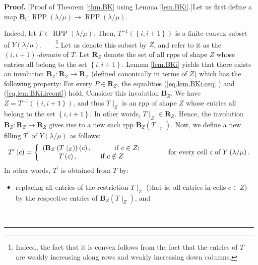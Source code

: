 \documentclass[numbers=enddot,12pt,final,onecolumn,notitlepage]{scrartcl}%
\theoremstyle{definition}
\newenvironment{proof}[1][Proof]{\noindent\textbf{#1.} }{\ \rule{0.5em}{0.5em}}
\newenvironment{verlong}{}{}
\begin{document}
\begin{verlong}
\begin{proof}
[Proof of Theorem \ref{thm.BK} using Lemma \ref{lem.BKi}.]Let us first define
a map $\mathbf{B}_{i}:\operatorname*{RPP}\left(  \lambda/\mu\right)
\rightarrow\operatorname*{RPP}\left(  \lambda/\mu\right)  $.

Indeed, let $T\in\operatorname*{RPP}\left(  \lambda/\mu\right)  $. Then,
$T^{-1}\left(  \left\{  i,i+1\right\}  \right)  $ is a finite convex subset of
$Y\left(  \lambda/\mu\right)  $.\ \ \ \ \footnote{Indeed, the fact that it is
convex follows from the fact that the entries of $T$ are weakly increasing
along rows and weakly increasing down columns.} Let us denote this subset by
$Z$, and refer to it as the $\left(  i,i+1\right)  $\textit{-domain} of $T$.
Let $\mathbf{R}_{Z}$ denote the set of all rpps of shape $Z$ whose entries all
belong to the set $\left\{  i,i+1\right\}  $. Lemma \ref{lem.BKi} yields that
there exists an involution $\mathbf{B}_{Z}:\mathbf{R}_{Z}\rightarrow
\mathbf{R}_{Z}$ (defined canonically in terms of $Z$) which has the following
property: For every $P\in\mathbf{R}_{Z}$, the equalities (\ref{eq.lem.BKi.ceq}%
) and (\ref{eq.lem.BKi.ircont}) hold. Consider this involution $\mathbf{B}%
_{Z}$. We have $Z=T^{-1}\left(  \left\{  i,i+1\right\}  \right)  $, and thus
$T\mid_{Z}$ is an rpp of shape $Z$ whose entries all belong to the set
$\left\{  i,i+1\right\}  $. In other words, $T\mid_{Z}\in\mathbf{R}_{Z}$.
Hence, the involution $\mathbf{B}_{Z}:\mathbf{R}_{Z}\rightarrow\mathbf{R}_{Z}$
gives rise to a new such rpp $\mathbf{B}_{Z}\left(  T\mid_{Z}\right)  $. Now,
we define a new filling $T^{\prime}$ of $Y\left(  \lambda/\mu\right)  $ as
follows:%
\[
T^{\prime}\left(  c\right)  =\left\{
\begin{array}
[c]{c}%
\left(  \mathbf{B}_{Z}\left(  T\mid_{Z}\right)  \right)  \left(  c\right)
,\ \ \ \ \ \ \ \ \ \ \text{if }c\in Z;\\
T\left(  c\right)  ,\ \ \ \ \ \ \ \ \ \ \text{if }c\notin Z
\end{array}
\right.  \ \ \ \ \ \ \ \ \ \ \text{for every cell }c\text{ of }Y\left(
\lambda/\mu\right)  .
\]
In other words, $T^{\prime}$ is obtained from $T$ by:

\begin{itemize}
\item replacing all entries of the restriction $T\mid_{Z}$ (that is, all
entries in cells $c\in Z$) by the respective entries of $\mathbf{B}_{Z}\left(
T\mid_{Z}\right)  $, and


\end{itemize}
\end{proof}
\end{verlong}
\end{document}
